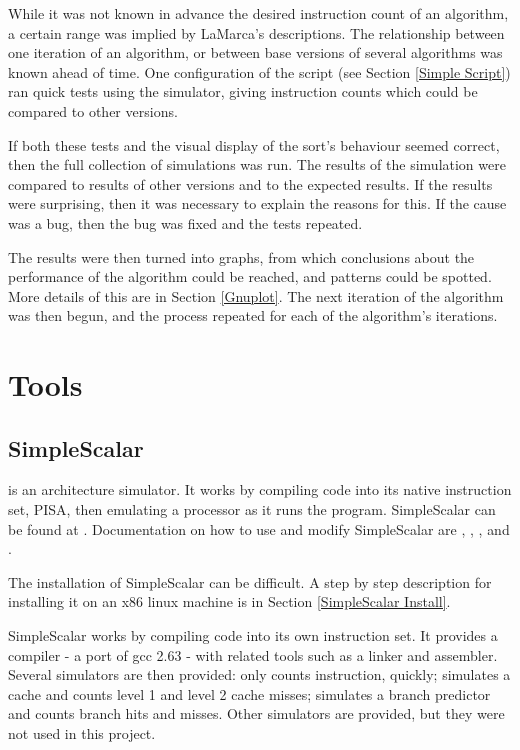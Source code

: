While it was not known in advance the desired instruction count of an algorithm,
a certain range was implied by LaMarca's descriptions. The relationship between
one iteration of an algorithm, or between base versions of several algorithms was
known ahead of time. One configuration of the  script (see
Section \ref{Simple Script}) ran quick tests using the  simulator,
giving instruction counts which could be compared to other versions. 

If both these tests and the visual display of the sort's behaviour seemed
correct, then the full collection of simulations was run. The results of the
simulation were compared to results of other versions and to the expected
results. If the results were surprising, then it was necessary to explain the
reasons for this. If the cause was a bug, then the bug was fixed and the tests
repeated.

The results were then turned into graphs, from which conclusions about the
performance of the algorithm could be reached, and patterns could be spotted.
More details of this are in Section \ref{Gnuplot}. The next iteration of the
algorithm was then begun, and the process repeated for each of the
algorithm's iterations.

\section{Tools}

\subsection{SimpleScalar}
 is an architecture simulator. It works by compiling code into its
native instruction set, PISA, then emulating a processor as it runs the program.
SimpleScalar can be found at . Documentation on how
to use and modify SimpleScalar are \cite{Burger97}, \cite{Austin02},
\cite{Tutorialv4}, \cite{Tutorialv2} and \cite{SimpleScalarUserGuide}.

The installation of SimpleScalar can be difficult. A step by step description
for installing it on an x86 linux machine is in Section \ref{SimpleScalar
Install}.

SimpleScalar works by compiling code into its own instruction set. It provides a
compiler - a port of gcc 2.63 - with related tools such as a linker and assembler.
Several simulators are then provided:  only counts instruction,
quickly;  simulates a cache and counts level 1 and level 2 cache
misses;  simulates a branch predictor and counts branch hits and
misses. Other simulators are provided, but they were not used in this project.

